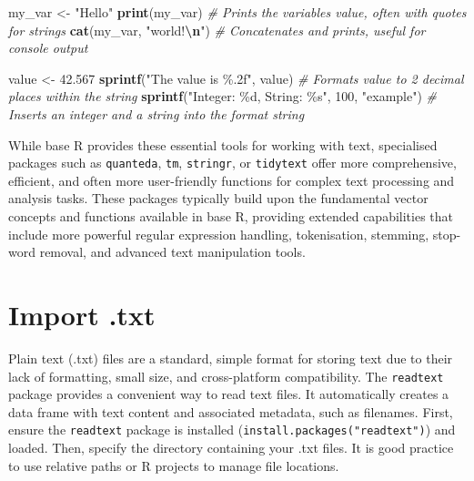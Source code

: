 \documentclass[
]{book}
\newenvironment{Shaded}{\begin{snugshade}}{\end{snugshade}}
\newcommand{\CommentTok}[1]{\textcolor[rgb]{0.56,0.35,0.01}{\textit{#1}}}
\newcommand{\DecValTok}[1]{\textcolor[rgb]{0.00,0.00,0.81}{#1}}
\newcommand{\FloatTok}[1]{\textcolor[rgb]{0.00,0.00,0.81}{#1}}
\newcommand{\FunctionTok}[1]{\textcolor[rgb]{0.13,0.29,0.53}{\textbf{#1}}}
\newcommand{\NormalTok}[1]{#1}
\newcommand{\OtherTok}[1]{\textcolor[rgb]{0.56,0.35,0.01}{#1}}
\newcommand{\SpecialCharTok}[1]{\textcolor[rgb]{0.81,0.36,0.00}{\textbf{#1}}}
\newcommand{\StringTok}[1]{\textcolor[rgb]{0.31,0.60,0.02}{#1}}
\begin{document}
\begin{Shaded}
\begin{Highlighting}[]
\NormalTok{my\_var }\OtherTok{\textless{}{-}} \StringTok{"Hello"}
\FunctionTok{print}\NormalTok{(my\_var)  }\CommentTok{\# Prints the variable\textquotesingle{}s value, often with quotes for strings}
\FunctionTok{cat}\NormalTok{(my\_var, }\StringTok{"world!}\SpecialCharTok{\textbackslash{}n}\StringTok{"}\NormalTok{)  }\CommentTok{\# Concatenates and prints, useful for console output}

\NormalTok{value }\OtherTok{\textless{}{-}} \FloatTok{42.567}
\FunctionTok{sprintf}\NormalTok{(}\StringTok{"The value is \%.2f"}\NormalTok{, value)  }\CommentTok{\# Formats\textquotesingle{} value\textquotesingle{} to 2 decimal places within the string}
\FunctionTok{sprintf}\NormalTok{(}\StringTok{"Integer: \%d, String: \%s"}\NormalTok{, }\DecValTok{100}\NormalTok{, }\StringTok{"example"}\NormalTok{)  }\CommentTok{\# Inserts an integer and a string into the format string}
\end{Highlighting}
\end{Shaded}

While base R provides these essential tools for working with text, specialised packages such as \texttt{quanteda}, \texttt{tm}, \texttt{stringr}, or \texttt{tidytext} offer more comprehensive, efficient, and often more user-friendly functions for complex text processing and analysis tasks. These packages typically build upon the fundamental vector concepts and functions available in base R, providing extended capabilities that include more powerful regular expression handling, tokenisation, stemming, stop-word removal, and advanced text manipulation tools.

\section{Import .txt}\label{import-.txt}

Plain text (.txt) files are a standard, simple format for storing text due to their lack of formatting, small size, and cross-platform compatibility. The \texttt{readtext} package provides a convenient way to read text files. It automatically creates a data frame with text content and associated metadata, such as filenames. First, ensure the \texttt{readtext} package is installed (\texttt{install.packages("readtext")}) and loaded. Then, specify the directory containing your .txt files. It is good practice to use relative paths or R projects to manage file locations.
\end{document}

